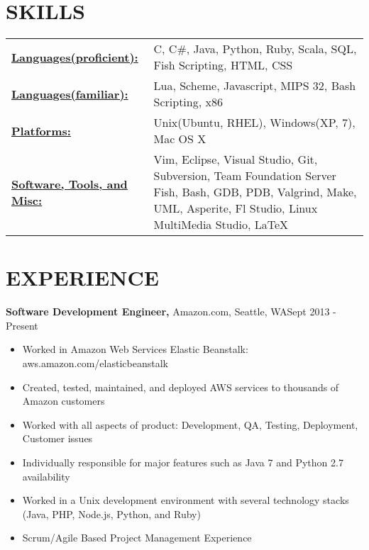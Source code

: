 \documentclass{res}
\begin{document}
 
\address{2226 Elliott Ave Apt 113, Seattle, WA 98121 (928) 284-5522 Charliec364@gmail.com }


\begin{resume}
\footnotesize

\section{SKILLS}
   \begin{tabular}{l p{3in}}
     \underline{\bf Languages(proficient):} & C, C\#, Java, Python, Ruby, Scala, SQL, Fish Scripting, HTML, CSS \\
     \underline{\bf Languages(familiar):} & Lua, Scheme, Javascript, MIPS 32, Bash Scripting, x86 \\
     \underline{\bf Platforms:} & Unix(Ubuntu, RHEL), Windows(XP, 7), Mac OS X \\
     \underline{\bf Software, Tools, and Misc:} &  Vim, Eclipse, Visual Studio,
                        Git, Subversion, Team Foundation Server
                        Fish, Bash, GDB, PDB, Valgrind, Make, 
                        UML, Asperite, Fl Studio, Linux MultiMedia Studio, \LaTeX\
 \end{tabular}
 
\section{EXPERIENCE}
  {\bf Software Development Engineer,} Amazon.com, Seattle, WA\hfill Sept 2013 - Present
  \begin{itemize} \itemsep -2pt  %
    \item Worked in Amazon Web Services Elastic Beanstalk: aws.amazon.com/elasticbeanstalk
    \item Created, tested, maintained, and deployed AWS services to thousands of Amazon customers
    \item Worked with all aspects of product: Development, QA, Testing, Deployment, Customer issues
    \item Individually responsible for major features such as Java 7 and Python 2.7 availability
    \item Worked in a Unix development environment with several technology stacks (Java, PHP, Node.js, Python, and Ruby)
    \item Scrum/Agile Based Project Management Experience
  \end{itemize}


\end{resume}
\end{document}
